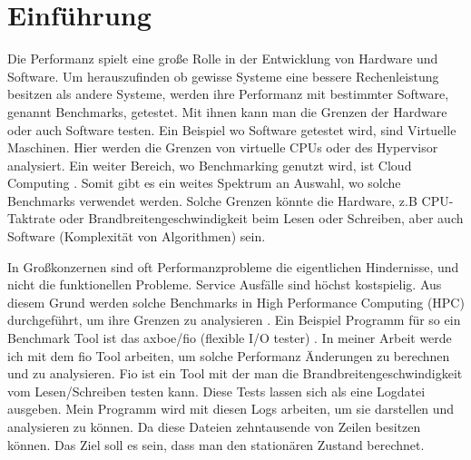 \documentclass{article}
\begin{document}
\tableofcontents{}


\newpage
\section{Einführung}
Die Performanz spielt eine große Rolle in der Entwicklung von Hardware und Software. Um herauszufinden ob gewisse Systeme eine bessere Rechenleistung besitzen als andere Systeme, 
werden ihre Performanz mit bestimmter Software, genannt Benchmarks, getestet.
Mit ihnen kann man die Grenzen der Hardware oder auch Software testen. Ein Beispiel wo Software getestet wird, sind Virtuelle Maschinen. 
Hier werden die Grenzen von virtuelle CPUs oder des Hypervisor analysiert. \cite{9256518}
Ein weiter Bereich, wo Benchmarking genutzt wird, ist Cloud Computing \cite{10.1145/2493123.2462919}. Somit gibt es ein weites Spektrum an Auswahl, wo solche Benchmarks verwendet werden.
Solche Grenzen könnte die Hardware, z.B CPU-Taktrate oder Brandbreitengeschwindigkeit beim Lesen oder Schreiben, aber auch Software (Komplexität von Algorithmen) sein. 



In Großkonzernen sind oft Performanzprobleme die eigentlichen Hindernisse, und nicht die funktionellen Probleme. Service Ausfälle sind höchst kostspielig. 
Aus diesem Grund werden solche Benchmarks in High Performance Computing (HPC) durchgeführt, um ihre Grenzen zu analysieren \cite{whenStopPerformanceTest}.
Ein Beispiel Programm für so ein Benchmark Tool ist das axboe/fio (flexible I/O tester) \cite{axboe2021github}.
In meiner Arbeit werde ich mit dem fio Tool arbeiten, um solche Performanz Änderungen zu berechnen und zu analysieren.
Fio ist ein Tool mit der man die Brandbreitengeschwindigkeit vom Lesen/Schreiben testen kann. Diese Tests lassen sich als eine Logdatei ausgeben.
Mein Programm wird mit diesen Logs arbeiten, um sie darstellen und analysieren zu können. Da diese Dateien zehntausende von Zeilen besitzen können.
Das Ziel soll es sein, dass man den stationären Zustand berechnet. \cite{baseline}
\end{document}
